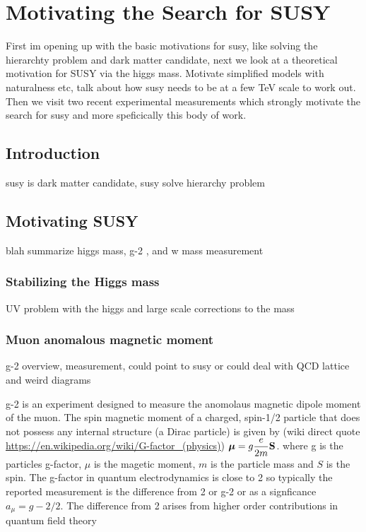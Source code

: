 
\setcounter{secnumdepth}{3}
\setcounter{tocdepth}{3}

\setlength{\parindent}{1 em}


\makeatother


\chapter{Motivating the Search for SUSY}

\begin{chapterabstract}
First im opening up with the basic motivations for susy, like solving the hierarchty problem and dark matter candidate, next we look at a theoretical motivation for SUSY via the higgs mass. Motivate simplified models with naturalness etc, talk about how susy needs to be at a few TeV scale to work out. Then we visit two recent experimental measurements which strongly motivate the search for susy and more speficically this body of work.
\end{chapterabstract}

\section{Introduction}
susy is dark matter candidate, susy solve hierarchy problem


\section{Motivating SUSY}
blah summarize higgs mass, g-2 , and w mass measurement


\subsection{Stabilizing the Higgs mass}
UV problem with the higgs and large scale corrections to the mass
\subsection{Muon anomalous magnetic moment}
g-2 overview, measurement, could point to susy or could deal with QCD lattice and weird diagrams

g-2 is an experiment designed to measure the anomolaus magnetic dipole moment of the muon. The spin magnetic moment of a charged, spin-1/2 particle that does not possess any internal structure (a Dirac particle) is given by (wiki direct quote \url{https://en.wikipedia.org/wiki/G-factor_(physics)}) ${\displaystyle {\boldsymbol {\mu }}=g{e \over 2m}\mathbf {S} }$. where g is the particles g-factor, $\mu$ is the magetic moment, $m$ is the particle mass and $S$ is the spin. The g-factor in quantum electrodynamics is close to 2 so typically the reported measurement is the difference from 2 or g-2 or as a signficance $a_\mu = g-2/2$. The difference from 2 arises from higher order contributions in quantum field theory


